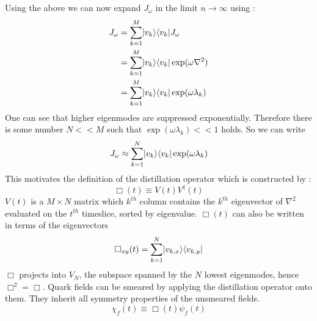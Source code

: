     Using the above we can now expand $J_\omega$ in the limit $n\rightarrow\infty$ using :
    \begin{equation}
        \begin{aligned}
            J_\omega &= \sum^M_{k=1}\lvert v_k\rangle\langle v_k\rvert J_\omega\\
            &= \sum^M_{k=1}\lvert v_k\rangle\langle v_k\rvert \exp(\omega\nabla^2)\\
            &= \sum^M_{k=1}\lvert v_k\rangle\langle v_k\rvert \exp(\omega\lambda_k)
        \end{aligned}
    \end{equation}
    One can see that higher eigenmodes are suppressed exponentially. Therefore there is some number $N<<M$ such that $\exp(\omega\lambda_k) << 1$ holds. So we can write
    \begin{equation}
        J_\omega \approx \sum^N_{k=1}\lvert v_k\rangle\langle v_k\rvert \exp(\omega\lambda_k)
    \end{equation}
    This motivates the definition of the distillation operator which is constructed by \cite{distillation_paper}:
    \begin{equation}
        \Box(t) \equiv V(t)V^\dagger(t)
    \end{equation}
    $V(t)$ is a $M \times N$ matrix which $k^{th}$ column contains the $k^{th}$ eigenvector of $\nabla^2$ evaluated on the $t^{th}$ timeslice, sorted by eigenvalue. $\Box(t)$ can also be written in terms of the eigenvectors
    \begin{equation}
        \Box_{xy}(t) = \sum^N_{k=1}\lvert v_{k,x}\rangle\langle v_{k,y}\rvert
    \end{equation}
    $\Box$ projects into $V_N$, the subspace spanned by the $N$ lowest eigenmodes, hence $\Box^2 = \Box$. Quark fields can be smeared by applying the distillation operator onto them. They inherit all symmetry properties of the unsmeared fields.
    \begin{equation}
        \chi_f(t) \equiv \Box(t) \psi_f(t)
    \end{equation}
    
